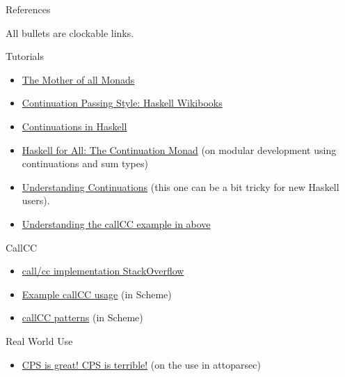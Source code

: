 \documentclass[ignorenonframetext,]{beamer}
\begin{document}
\begin{frame}[allowframebreaks]{References}

All bullets are clockable links.

Tutorials

\begin{itemize}
\itemsep1pt\parskip0pt
\item
  \href{http://blog.sigfpe.com/2008/12/mother-of-all-monads.html}{The
  Mother of all Monads}
\item
  \href{http://en.wikibooks.org/wiki/Haskell/Continuation_passing_style}{Continuation
  Passing Style: Haskell Wikibooks}
\item
  \href{http://www.codejury.com/continuations-in-haskell/}{Continuations
  in Haskell}
\item
  \href{http://www.haskellforall.com/2012/12/the-continuation-monad.html}{Haskell
  for All: The Continuation Monad} (on modular development using
  continuations and sum types)
\item
  \href{https://www.fpcomplete.com/user/jwiegley/understanding-continuations}{Understanding
  Continuations} (this one can be a bit tricky for new Haskell users).
\item
  \href{http://stackoverflow.com/questions/20536700/understanding-haskell-callcc-examples}{Understanding
  the callCC example in above}
\end{itemize}

CallCC

\begin{itemize}
\itemsep1pt\parskip0pt
\item
  \href{http://stackoverflow.com/questions/9050725/call-cc-implementation}{call/cc
  implementation StackOverflow}
\item
  \href{http://rigaux.org/language-study/various/callcc/scheme.html}{Example
  callCC usage} (in Scheme)
\item
  \href{http://repository.readscheme.org/ftp/papers/PLoP2001_dferguson0_1.pdf}{callCC
  patterns} (in Scheme)
\end{itemize}

Real World Use

\begin{itemize}
\itemsep1pt\parskip0pt
\item
  \href{http://www.serpentine.com/blog/2011/02/25/cps-is-great-cps-is-terrible/}{CPS
  is great! CPS is terrible!} (on the use in attoparsec)
\end{itemize}


\end{frame}
\end{document}
